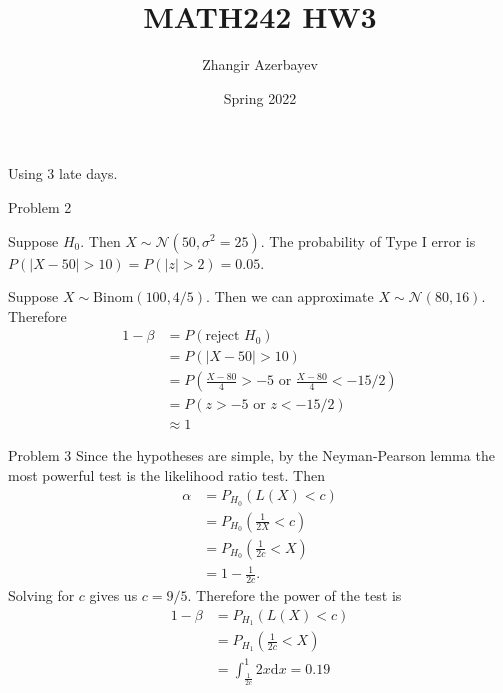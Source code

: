 \documentclass{article}
\title{MATH242 HW3}
\author{Zhangir Azerbayev}
\date{Spring 2022}
\begin{document}
\maketitle
Using 3 late days. 




\begin{question}{Problem 2}
    \begin{part}
        Suppose $H_0$. Then $X\sim\mathcal{N}(50, \sigma^2=25)$. The probability of Type I error is $P(|X-50|>10) = P(|z|>2) = 0.05$. 
    \end{part}
    \begin{part}
        Suppose $X\sim \mathrm{Binom}(100, 4/5)$. Then we can approximate $X\sim \mathcal{N}(80, 16)$. Therefore 
        \begin{align*}
            1 - \beta &= P(\text{reject }H_0)\\
                      &= P(|X-50|>10)\\
                      &= P\left(\frac{X-80}{4} > -5 \text{ or } \frac{X-80}{4} < -15/2\right)\\
                      &= P(z > -5 \text{ or } z < -15/2)\\
                      &\approx 1
        \end{align*}
    \end{part}
\end{question}
\begin{question}{Problem 3}
    Since the hypotheses are simple, by the Neyman-Pearson lemma the most powerful test is the likelihood ratio test. Then 
    \begin{align*}
        \alpha &= P_{H_0}(L(X)<c)\\
               &= P_{H_0}\left(\frac{1}{2X} < c\right)\\
               &= P_{H_0}\left(\frac{1}{2c} < X\right)\\
               &= 1 - \frac{1}{2c}. 
    \end{align*}
    Solving for $c$ gives us $c=9/5$. Therefore the power of the test is
    \begin{align*}
        1-\beta &= P_{H_1}(L(X)<c)\\
                &= P_{H_1}\left(\frac{1}{2c} < X\right)\\
                &= \int_{\frac{1}{2c}}^1 2x\mathrm{d}x = 0.19
    \end{align*}
\end{question}
\end{document}
